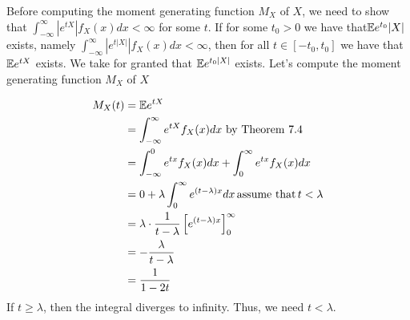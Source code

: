 
Before computing the moment generating function $ M_{X} $ of $ X$, we need to show that $
\int_{-\infty}^{\infty} |e^{tX} | f_{X} (x)dx < \infty$ for some $ t$. If for some $ t_{0} > 0 $ we
have that$ \mathbb{E} e^{t_{0} }|X| $ exists, 
namely $ \int_{-\infty}^{\infty} |e^{t|X|} | f_{X} (x) dx < \infty$, then for all $ t \in [-t_{0},
t_{0} ]	 $ we have that $ \mathbb{E} e^{t X } $ exists. We take for granted that $ \mathbb{E} e^{t_{0} |X|} $
exists.
Let's compute the moment generating function $ M_{X} $ of $ X$

\begin{align*}
    M_{X} (t) &= \mathbb{E} e^{tX} \\
	      &= \int_{-\infty}^{\infty} e^{tX} f_{X} (x) dx \mbox{ by Theorem 7.4} \\
	      &= \int_{-\infty}^{0} e^{tx} f_{X} (x) dx + \int_{0}^{\infty} e^{tx} f_{X} (x) dx\\
	      &= 0 + \lambda \int_{0}^{\infty} e^{(t-\lambda)x} dx \, \mbox{assume that} \, t <
	      \lambda \\
	      &= \lambda \cdot \frac{1}{t - \lambda} \left[ e^{(t-\lambda)x}  \right]_{0}^{\infty}
	      \\
	      &= -\frac{\lambda}{t-\lambda} \\
	      &= \frac{1}{1-2t} 
\end{align*}
If $ t \geq \lambda$, then the integral diverges to infinity. Thus, we need $ t < \lambda$. 
